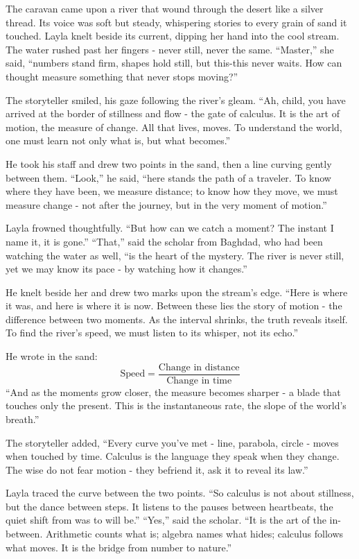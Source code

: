 \documentclass[
  letterpaper,
  DIV=11,
  numbers=noendperiod]{scrreprt}
\begin{document}
The caravan came upon a river that wound through the desert like a
silver thread. Its voice was soft but steady, whispering stories to
every grain of sand it touched. Layla knelt beside its current, dipping
her hand into the cool stream. The water rushed past her fingers - never
still, never the same. ``Master,'' she said, ``numbers stand firm,
shapes hold still, but this-this never waits. How can thought measure
something that never stops moving?''

The storyteller smiled, his gaze following the river's gleam. ``Ah,
child, you have arrived at the border of stillness and flow - the gate
of calculus. It is the art of motion, the measure of change. All that
lives, moves. To understand the world, one must learn not only what is,
but what becomes.''

He took his staff and drew two points in the sand, then a line curving
gently between them. ``Look,'' he said, ``here stands the path of a
traveler. To know where they have been, we measure distance; to know how
they move, we must measure change - not after the journey, but in the
very moment of motion.''

Layla frowned thoughtfully. ``But how can we catch a moment? The instant
I name it, it is gone.'' ``That,'' said the scholar from Baghdad, who
had been watching the water as well, ``is the heart of the mystery. The
river is never still, yet we may know its pace - by watching how it
changes.''

He knelt beside her and drew two marks upon the stream's edge. ``Here is
where it was, and here is where it is now. Between these lies the story
of motion - the difference between two moments. As the interval shrinks,
the truth reveals itself. To find the river's speed, we must listen to
its whisper, not its echo.''

He wrote in the sand: \[
\text{Speed} = \frac{\text{Change in distance}}{\text{Change in time}}
\] ``And as the moments grow closer, the measure becomes sharper - a
blade that touches only the present. This is the instantaneous rate, the
slope of the world's breath.''

The storyteller added, ``Every curve you've met - line, parabola, circle
- moves when touched by time. Calculus is the language they speak when
they change. The wise do not fear motion - they befriend it, ask it to
reveal its law.''

Layla traced the curve between the two points. ``So calculus is not
about stillness, but the dance between steps. It listens to the pauses
between heartbeats, the quiet shift from was to will be.'' ``Yes,'' said
the scholar. ``It is the art of the in-between. Arithmetic counts what
is; algebra names what hides; calculus follows what moves. It is the
bridge from number to nature.''
\end{document}
